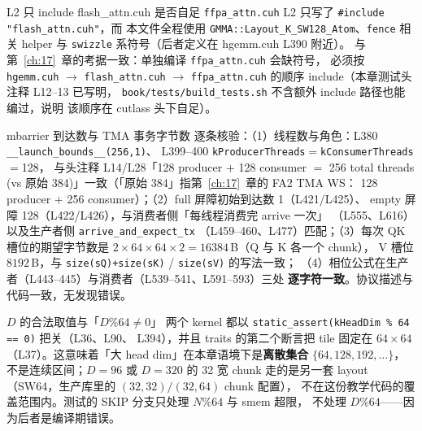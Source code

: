 \begin{kaogu}[F1·依赖关系核校通过]{L2 只 include flash\_attn.cuh 是否自足}
  \texttt{ffpa\_\allowbreak{}attn.\allowbreak{}cuh} L2 只写了 \texttt{\#include "flash\_\allowbreak{}attn.\allowbreak{}cuh"}，而
  本文件全程使用 \texttt{GMMA::\allowbreak{}Layout\_\allowbreak{}K\_\allowbreak{}SW128\_\allowbreak{}Atom}、\texttt{fence} 相关
  helper 与 \texttt{swizzle} 系符号（后者定义在 hgemm.cuh L390 附近）。
  与第~\ref{ch:17}~章的考据一致：单独编译 \texttt{ffpa\_\allowbreak{}attn.\allowbreak{}cuh} 会缺符号，
  必须按 \texttt{hgemm.cuh} $\to$ \texttt{flash\_\allowbreak{}attn.\allowbreak{}cuh} $\to$
  \texttt{ffpa\_\allowbreak{}attn.\allowbreak{}cuh} 的顺序 include（本章测试头注释 L12--13 已写明，
  \texttt{book/\allowbreak{}tests/\allowbreak{}build\_\allowbreak{}tests.\allowbreak{}sh} 不含额外 include 路径也能编过，说明
  该顺序在 cutlass 头下自足）。
\end{kaogu}

\begin{kaogu}[F2/F3·协议计数核校通过]{mbarrier 到达数与 TMA 事务字节数}
  逐条核验：（1）线程数与角色：L380 \texttt{\_\_launch\_}\allowbreak\texttt{bounds\_\allowbreak{}\_\allowbreak{}(256,\allowbreak{}1)}、
  L399--400 \texttt{k\allowbreak{}Producer\allowbreak{}Threads}$=$\texttt{k\allowbreak{}Consumer\allowbreak{}Threads}$=$128，
  与头注释 L14/L28「128 producer $+$ 128 consumer $=$ 256 total threads
  (vs 原始 384)」一致（「原始 384」指第~\ref{ch:17}~章的 FA2 TMA WS：
  128 producer $+$ 256 consumer）；（2）full 屏障初始到达数 1（L421/L425）、
  empty 屏障 128（L422/L426），与消费者侧「每线程消费完 arrive 一次」
  （L555、L616）以及生产者侧 \texttt{arrive\_\allowbreak{}and\_\allowbreak{}expect\_\allowbreak{}tx}
  （L459--460、L477）匹配；（3）每次 QK 槽位的期望字节数是
  $2 \times 64 \times 64 \times 2 = 16384$\,B（Q 与 K 各一个 chunk），
  V 槽位 $8192$\,B，与 \texttt{size\allowbreak{}(s\allowbreak{}Q)+size\allowbreak{}(s\allowbreak{}K)} / \texttt{size(sV)} 的写法一致；
  （4）相位公式在生产者（L443--445）与消费者（L539--541、L591--593）三处
  \textbf{逐字符一致}。协议描述与代码一致，无发现错误。
\end{kaogu}

\begin{kaogu}[F1·边界提醒]{$D$ 的合法取值与「$D\%64 \ne 0$」}
  两个 kernel 都以 \texttt{static\_\allowbreak{}assert\allowbreak{}(k\allowbreak{}Head\allowbreak{}Dim \% 64 =\allowbreak{}=\allowbreak{} 0)} 把关（L36、L90、
  L394），并且 traits 的第二个断言把 tile 固定在 $64\times64$
  （L37）。这意味着「大 head dim」在本章语境下是\textbf{离散集合}
  $\{64, 128, 192, \ldots\}$，不是连续区间；$D{=}96$ 或 $D{=}320$ 的 32 宽
  chunk 走的是另一套 layout（SW64，生产库里的 $(32,32)/(32,64)$ chunk 配置），
  不在这份教学代码的覆盖范围内。测试的 SKIP 分支只处理 $N\%64$ 与 smem 超限，
  不处理 $D\%64$——因为后者是编译期错误。
\end{kaogu}

